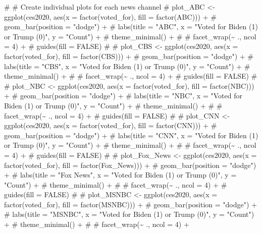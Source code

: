 \documentclass[
  letterpaper,
  DIV=11,
  numbers=noendperiod]{scrartcl}
\newenvironment{Shaded}{\begin{snugshade}}{\end{snugshade}}
\newcommand{\CommentTok}[1]{\textcolor[rgb]{0.37,0.37,0.37}{#1}}
\begin{document}
\begin{Shaded}
\begin{Highlighting}[]
\CommentTok{\# \# Create individual plots for each news channel}
\CommentTok{\# plot\_ABC \textless{}{-} ggplot(ces2020, aes(x = factor(voted\_for), fill = factor(ABC))) +}
\CommentTok{\#   geom\_bar(position = "dodge") +}
\CommentTok{\#   labs(title = "ABC", x = "Voted for Biden (1) or Trump (0)", y = "Count") +}
\CommentTok{\#   theme\_minimal() +}
\CommentTok{\#  \# facet\_wrap(\textasciitilde{} ., ncol = 4) +}
\CommentTok{\#   guides(fill = FALSE)}
\CommentTok{\# }
\CommentTok{\# plot\_CBS \textless{}{-} ggplot(ces2020, aes(x = factor(voted\_for), fill = factor(CBS))) +}
\CommentTok{\#   geom\_bar(position = "dodge") +}
\CommentTok{\#   labs(title = "CBS", x = "Voted for Biden (1) or Trump (0)", y = "Count") +}
\CommentTok{\#   theme\_minimal() +}
\CommentTok{\#  \# facet\_wrap(\textasciitilde{} ., ncol = 4) +}
\CommentTok{\#   guides(fill = FALSE)}
\CommentTok{\# }
\CommentTok{\# plot\_NBC \textless{}{-} ggplot(ces2020, aes(x = factor(voted\_for), fill = factor(NBC))) +}
\CommentTok{\#   geom\_bar(position = "dodge") +}
\CommentTok{\#   labs(title = "NBC", x = "Voted for Biden (1) or Trump (0)", y = "Count") +}
\CommentTok{\#   theme\_minimal() +}
\CommentTok{\#  \# facet\_wrap(\textasciitilde{} ., ncol = 4) +}
\CommentTok{\#   guides(fill = FALSE)}
\CommentTok{\# }
\CommentTok{\# plot\_CNN \textless{}{-} ggplot(ces2020, aes(x = factor(voted\_for), fill = factor(CNN))) +}
\CommentTok{\#   geom\_bar(position = "dodge") +}
\CommentTok{\#   labs(title = "CNN", x = "Voted for Biden (1) or Trump (0)", y = "Count") +}
\CommentTok{\#   theme\_minimal() +}
\CommentTok{\#  \# facet\_wrap(\textasciitilde{} ., ncol = 4) +}
\CommentTok{\#   guides(fill = FALSE)}
\CommentTok{\# }
\CommentTok{\# plot\_Fox\_News \textless{}{-} ggplot(ces2020, aes(x = factor(voted\_for), fill = factor(Fox\_News))) +}
\CommentTok{\#   geom\_bar(position = "dodge") +}
\CommentTok{\#   labs(title = "Fox News", x = "Voted for Biden (1) or Trump (0)", y = "Count") +}
\CommentTok{\#   theme\_minimal() +}
\CommentTok{\# \#  facet\_wrap(\textasciitilde{} ., ncol = 4) +}
\CommentTok{\#   guides(fill = FALSE)}
\CommentTok{\# }
\CommentTok{\# plot\_MSNBC \textless{}{-} ggplot(ces2020, aes(x = factor(voted\_for), fill = factor(MSNBC))) +}
\CommentTok{\#   geom\_bar(position = "dodge") +}
\CommentTok{\#   labs(title = "MSNBC", x = "Voted for Biden (1) or Trump (0)", y = "Count") +}
\CommentTok{\#   theme\_minimal() +}
\CommentTok{\# \#  facet\_wrap(\textasciitilde{} ., ncol = 4) +}

\end{Highlighting}
\end{Shaded}
\end{document}
